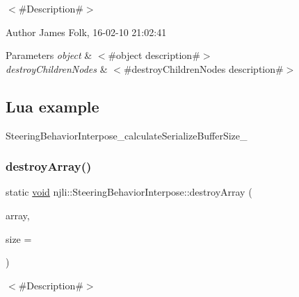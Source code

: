 $<$\#\+Description\#$>$ 

\begin{DoxyAuthor}{Author}
James Folk, 16-\/02-\/10 21\+:02\+:41
\end{DoxyAuthor}

\begin{DoxyParams}{Parameters}
{\em object} & $<$\#object description\#$>$ \\
\hline
{\em destroy\+Children\+Nodes} & $<$\#destroy\+Children\+Nodes description\#$>$\\
\hline
\end{DoxyParams}
\hypertarget{classnjli_1_1_steering_behavior_wander_ex1}{}\subsection{Lua example}\label{classnjli_1_1_steering_behavior_wander_ex1}

\begin{DoxyCodeInclude}
\end{DoxyCodeInclude}
Steering\+Behavior\+Interpose\+\_\+calculate\+Serialize\+Buffer\+Size\+\_\+ \mbox{\label{classnjli_1_1_steering_behavior_interpose_a611b45b2f46cf9fe0716c9f00b75bf38}} 
\subsubsection{\texorpdfstring{destroy\+Array()}{destroyArray()}}
{\footnotesize\ttfamily static \mbox{\hyperlink{_thread_8h_af1e856da2e658414cb2456cb6f7ebc66}{void}} njli\+::\+Steering\+Behavior\+Interpose\+::destroy\+Array (\begin{DoxyParamCaption}\item[{\mbox{\hyperlink{classnjli_1_1_steering_behavior_interpose}{Steering\+Behavior\+Interpose}} $\ast$$\ast$}]{array,  }\item[{const \mbox{\hyperlink{_util_8h_a10e94b422ef0c20dcdec20d31a1f5049}{u32}}}]{size = {} }\end{DoxyParamCaption})\hspace{0.3cm}{\ttfamily [static]}}



$<$\#\+Description\#$>$ 

